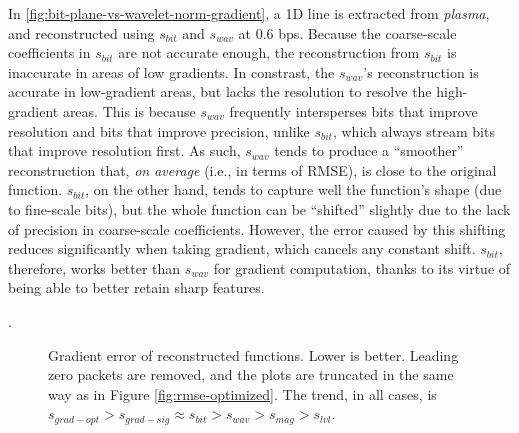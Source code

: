 In \autoref{fig:bit-plane-vs-wavelet-norm-gradient}, a 1D line is extracted from \emph{plasma}, and
reconstructed using $s_{bit}$ and $s_{wav}$ at 0.6 bps. Because the coarse-scale coefficients in
$s_{bit}$ are not accurate enough, the reconstruction from $s_{bit}$ is inaccurate in areas of low
gradients. In constrast, the $s_{wav}$'s reconstruction is accurate in low-gradient areas, but lacks
the resolution to resolve the high-gradient areas. This is because $s_{wav}$ frequently intersperses
bits that improve resolution and bits that improve precision, unlike $s_{bit}$, which always stream
bits that improve resolution first. As such, $s_{wav}$ tends to produce a ``smoother''
reconstruction that, \emph{on average} (i.e., in terms of RMSE), is close to the original function.
$s_{bit}$, on the other hand, tends to capture well the function's shape (due to fine-scale bits),
but the whole function can be ``shifted'' slightly due to the lack of precision in coarse-scale
coefficients. However, the error caused by this shifting reduces significantly when taking gradient,
which cancels any constant shift. $s_{bit}$, therefore, works better than $s_{wav}$ for gradient
computation, thanks to its virtue of being able to better retain sharp features.

.

\begin{figure}[h]
	\centering
	 \caption{Gradient
	error of reconstructed functions. Lower is better. Leading zero packets are removed, and the plots
	are truncated in the same way as in Figure \ref{fig:rmse-optimized}. The trend, in all cases, is
	$s_{grad-opt} > s_{grad-sig} \approx s_{bit} > s_{wav} > s_{mag} > s_{lvl}$.}
	\label{fig:gradient-error-comparison}
\end{figure}

